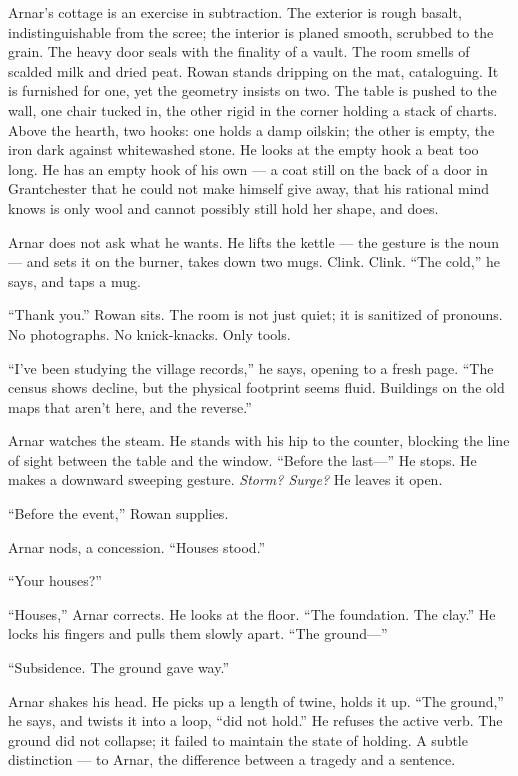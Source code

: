 \documentclass[11pt,oneside]{book}
\begin{document}
Arnar's cottage is an exercise in subtraction. The exterior is rough
basalt, indistinguishable from the scree; the interior is planed smooth,
scrubbed to the grain. The heavy door seals with the finality of a
vault. The room smells of scalded milk and dried peat. Rowan stands
dripping on the mat, cataloguing. It is furnished for one, yet the
geometry insists on two. The table is pushed to the wall, one chair
tucked in, the other rigid in the corner holding a stack of charts.
Above the hearth, two hooks: one holds a damp oilskin; the other is
empty, the iron dark against whitewashed stone. He looks at the empty
hook a beat too long. He has an empty hook of his own --- a coat still
on the back of a door in Grantchester that he could not make himself
give away, that his rational mind knows is only wool and cannot possibly
still hold her shape, and does.

Arnar does not ask what he wants. He lifts the kettle --- the gesture is
the noun --- and sets it on the burner, takes down two mugs. Clink.
Clink. ``The cold,'' he says, and taps a mug.

``Thank you.'' Rowan sits. The room is not just quiet; it is sanitized
of pronouns. No photographs. No knick-knacks. Only tools.

``I've been studying the village records,'' he says, opening to a fresh
page. ``The census shows decline, but the physical footprint seems
fluid. Buildings on the old maps that aren't here, and the reverse.''

Arnar watches the steam. He stands with his hip to the counter, blocking
the line of sight between the table and the window. ``Before the
last---'' He stops. He makes a downward sweeping gesture. \emph{Storm?
Surge?} He leaves it open.

``Before the event,'' Rowan supplies.

Arnar nods, a concession. ``Houses stood.''

``Your houses?''

``Houses,'' Arnar corrects. He looks at the floor. ``The foundation. The
clay.'' He locks his fingers and pulls them slowly apart. ``The
ground---''

``Subsidence. The ground gave way.''

Arnar shakes his head. He picks up a length of twine, holds it up. ``The
ground,'' he says, and twists it into a loop, ``did not hold.'' He
refuses the active verb. The ground did not collapse; it failed to
maintain the state of holding. A subtle distinction --- to Arnar, the
difference between a tragedy and a sentence.
\end{document}

